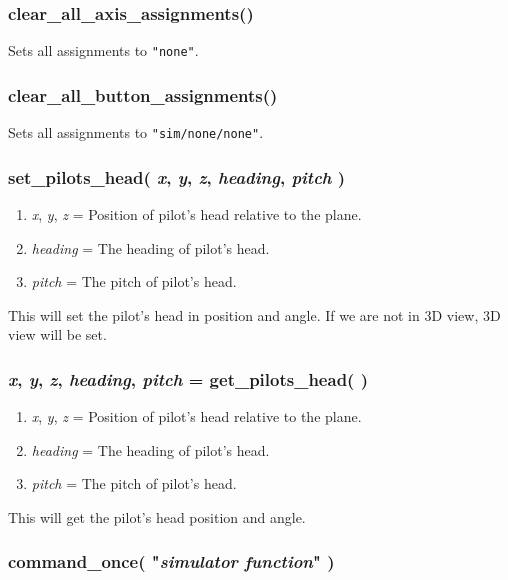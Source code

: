 \documentclass[11pt,parskip=half,a4paper]{scrartcl}
\begin{document}
\subsubsection{clear\_all\_axis\_assignments()}

Sets all assignments to \verb|"none"|.

\subsubsection{clear\_all\_button\_assignments()}

Sets all assignments to \verb|"sim/none/none"|.

\subsubsection{set\_pilots\_head( \emph{x}, \emph{y}, \emph{z}, \emph{heading}, \emph{pitch} )}

\begin{enumerate}
	\item \emph{x}, \emph{y}, \emph{z} = Position of pilot's head relative to the plane.
	\item \emph{heading} = The heading of pilot's head.
	\item \emph{pitch} = The pitch of pilot's head.
\end{enumerate}

This will set the pilot's head in position and angle. If we are not in 3D view, 3D view will be set.

\subsubsection{\emph{x}, \emph{y}, \emph{z}, \emph{heading}, \emph{pitch} = get\_pilots\_head(  )}

\begin{enumerate}
	\item \emph{x}, \emph{y}, \emph{z} = Position of pilot's head relative to the plane.
	\item \emph{heading} = The heading of pilot's head.
	\item \emph{pitch} = The pitch of pilot's head.
\end{enumerate}

This will get the pilot's head position and angle.

\subsubsection{command\_once( "\emph{simulator function}" )}
\end{document}
